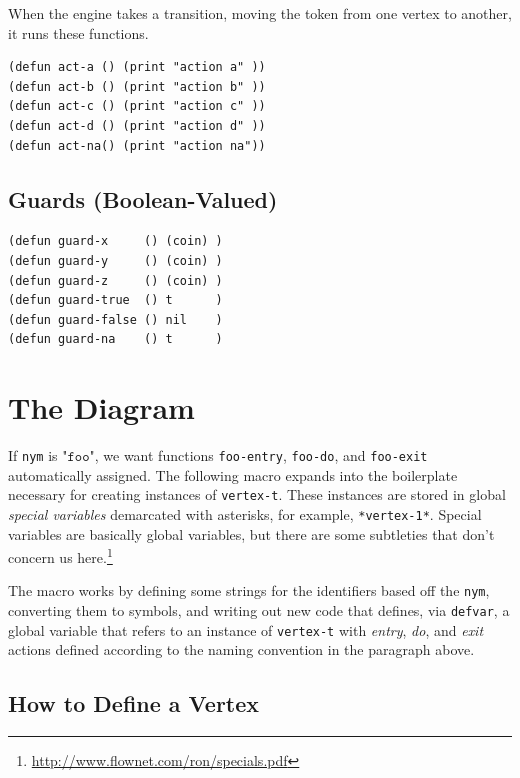 \documentclass[10pt,oneside,x11names]{article}
\begin{document}
When the engine takes a transition, moving the token from one vertex to
another, it runs these functions.

\begin{verbatim}
(defun act-a () (print "action a" ))
(defun act-b () (print "action b" ))
(defun act-c () (print "action c" ))
(defun act-d () (print "action d" ))
(defun act-na() (print "action na"))
\end{verbatim}

\subsection{Guards (Boolean-Valued)}
\label{sec:orge6bc995}

\begin{verbatim}
(defun guard-x     () (coin) )
(defun guard-y     () (coin) )
(defun guard-z     () (coin) )
(defun guard-true  () t      )
(defun guard-false () nil    )
(defun guard-na    () t      )
\end{verbatim}

\section{The Diagram}
\label{sec:org26671ce}

If \texttt{nym} is \(\texttt{"foo"}\), we want functions \texttt{foo-entry}, \texttt{foo-do}, and
\texttt{foo-exit} automatically assigned.  The following macro expands into the
boilerplate necessary for creating instances of \texttt{vertex-t}. These instances
are stored in global \emph{special variables} demarcated with asterisks, for
example, \texttt{*vertex-1*}. Special variables are basically global variables, but
there are some subtleties that don't concern us here.\footnote{\url{http://www.flownet.com/ron/specials.pdf}}

The macro works by defining some strings for the identifiers based off the
\texttt{nym}, converting them to symbols, and writing out new code that defines,
via \texttt{defvar}, a global variable that refers to an instance of \texttt{vertex-t}
with \emph{entry}, \emph{do}, and \emph{exit} actions defined according to the naming
convention in the paragraph above.

\subsection{How to Define a Vertex}
\label{sec:orgd416e92}
\end{document}

